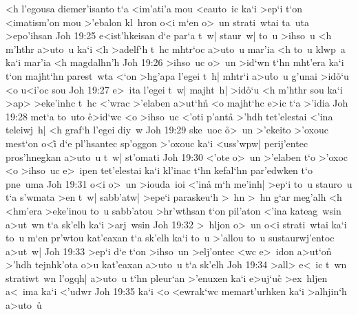 <h
l'egousa
diemer'isanto
t`a
<im'ati'a
mou
<eauto~ic
ka`i
>ep`i
t`on
<imatism'on
mou
>'ebalon
kl~hron
o<i
m`en
o>~un
strati~wtai
ta~uta
>epo'ihsan\bibvsend
\vs Joh 19:25
e<ist'hkeisan
d`e
par`a
t~w|
staur~w|
to~u
>ihso~u
<h
m'hthr
a>uto~u
ka`i
<h
>adelf`h
t~hc
mhtr`oc
a>uto~u
mar'ia
<h
to~u
klwp~a
ka`i
mar'ia
<h
magdalhn'h\bibvsend
\vs Joh 19:26
>ihso~uc
o>~un
>id`wn
t`hn
mht'era
ka`i
t`on
majht`hn
parest~wta
<`on
>hg'apa
l'egei
t~h|
mhtr`i
a>u\r{t}o~u
g'unai
>id\r{o}`u
<o
u<i'oc
sou\bibvsend
\vs Joh 19:27
e>~ita
l'egei
t~w|
majht~h|
>id\r{o}`u
<h
m'hthr
sou
ka`i
>ap>
>eke'inhc
t~hc
<'wrac
>'elaben
a>ut`hn\r{}
<o
majht`hc
e>ic
t`a
>'idia\bibvsend
\vs Joh 19:28
met`a
to~uto
\r{e}>id`wc
<o
>ihso~uc
<'oti
p'anta\r{}
>'hdh
tet'elestai
<'ina
teleiwj~h|
<h
graf`h
l'egei
diy~w\bibvsend
\vs Joh 19:29
ske~uoc
\r{o}>~un
>'ekeito
>'oxouc
mest`on
o<i\r{}
d`e
pl'hsantec
sp'oggon
>'oxouc
ka`i
<uss'wpw|
perij'entec
pros'hnegkan
a>uto~u
t~w|
st'omati\bibvsend
\vs Joh 19:30
<'ote
o>~un
>'elaben
t`o
>'oxoc
<o
>ihso~uc
e>~ipen
tet'elestai
ka`i
kl'inac
t`hn
kefal`hn
par'edwken
t`o
pne~uma\bibvsend
\vs Joh 19:31
o<i
o>~un
>iouda~ioi
<'ina\r{}
m`h
me'inh|
>ep`i
to~u
stauro~u
t`a
s'wmata
>en
t~w|
sabb'atw|
>epe`i
paraskeu`h
>~hn
>~hn
g`ar
meg'alh
<h
<hm'era
>eke'inou
to~u
sabb'atou
>hr'wthsan
t`on
pil'aton
<'ina
kateag~wsin
a>ut~wn
t`a
sk'elh
ka`i
>arj~wsin\bibvsend
\vs Joh 19:32
>~hljon
o>~un
o<i
strati~wtai
ka`i
to~u
m`en
pr'wtou
kat'eaxan
t`a
sk'elh
ka`i
to~u
>'allou
to~u
sustaurwj'entoc
a>ut~w|\bibvsend
\vs Joh 19:33
>ep`i
d`e
t`on
>ihso~un
>elj'ontec
<wc
e>~idon
a>ut`on\r{}
>'hdh
tejnhk'ota
o>u
kat'eaxan
a>uto~u
t`a
sk'elh\bibvsend
\vs Joh 19:34
>all>
e<~ic
t~wn
stratiwt~wn
\bibht
l'ogqh|
a>uto~u
t`hn
pleur`an
>'enuxen
ka`i
e>uj`uc\r{}
>ex~hljen
a<~ima
ka`i
<'udwr\bibvsend
\vs Joh 19:35
ka`i
<o
<ewrak`wc
memart'urhken
ka`i
>alhjin`h
a>uto~u\r{}
